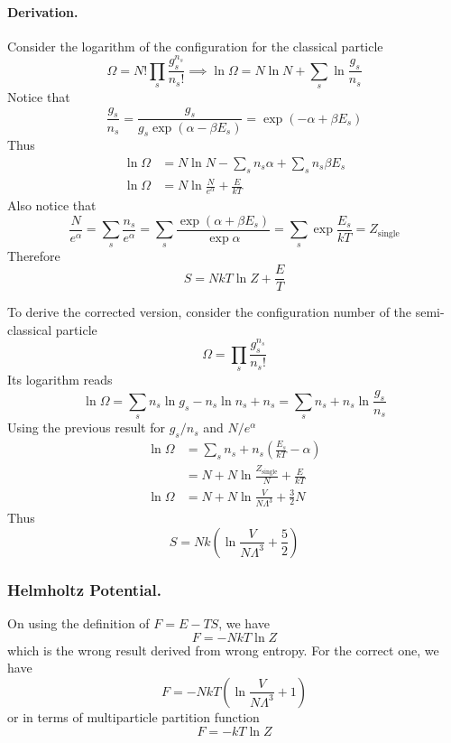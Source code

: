 \documentclass[../../../Main.tex]{subfiles}
\begin{document}
\paragraph*{Derivation.} Consider the logarithm of the configuration for the classical particle 
\begin{equation*}
    \Omega=N!\prod_s \frac{g_s^{n_s}}{n_s!}\implies
    \ln \Omega=N\ln N +\sum_s\ln\frac{g_s}{n_s}
\end{equation*} 
Notice that
\begin{equation*}
    \frac{g_s}{n_s}=\frac{g_s}{g_s\exp(\alpha-\beta E_s)}=\exp(-\alpha+\beta E_s)
\end{equation*}
Thus
\begin{align*}
    \ln \Omega&=N\ln N -\sum_sn_s\alpha +\sum_sn_s\beta E_s\\
    \ln\Omega&= N\ln \frac{N}{e^\alpha}+\frac{E}{kT}
\end{align*}
Also notice that 
\begin{equation*}
    \frac{N}{e^\alpha}=\sum_s\frac{n_s}{e^\alpha}=\sum_s\frac{\exp(\alpha+\beta E_s)}{\exp\alpha}=\sum_s\exp \frac{E_s}{kT}=Z_\text{single}
\end{equation*}
Therefore
\begin{equation*}
    S=NkT\ln Z+\frac{E}{T}
\end{equation*}

To derive the corrected version, consider the configuration number of the semi-classical particle
\begin{equation*}
    \Omega=\prod_s \frac{g_s^{n_s}}{n_s!}
\end{equation*}
Its logarithm reads
\begin{equation*}
    \ln \Omega=\sum_s n_s\ln g_s-n_s\ln n_s +n_s=\sum_s n_s+n_s\ln\frac{g_s}{n_s}
\end{equation*}
Using the previous result for $g_s/n_s$ and $N/e^\alpha$
\begin{align*}
    \ln \Omega &= \sum_s n_s+n_s\left(\frac{E_s}{kT}-\alpha\right)\\
    &= N+ N\ln\frac{Z_\text{single}}{N}+\frac{E}{kT}\\
    \ln \Omega &= N+ N\ln\frac{V}{N\Lambda^3}+\frac{3}{2}N
\end{align*}
Thus 
\begin{equation*}
    S=Nk\left(\ln\frac{V}{N\Lambda^3}+\frac{5}{2}\right)
\end{equation*}

\subsubsection*{Helmholtz Potential.} On using the definition of $F=E-TS$, we have 
\begin{equation*}
    F=-NkT\ln Z
\end{equation*}
which is the wrong result derived from wrong entropy. For the correct one, we have 
\begin{equation*}
    F=-NkT\left(\ln \frac{V}{N\Lambda^3}+1\right)
\end{equation*}
or in terms of multiparticle partition function
\begin{equation*}
    F=-kT\ln Z
\end{equation*}
\end{document}
